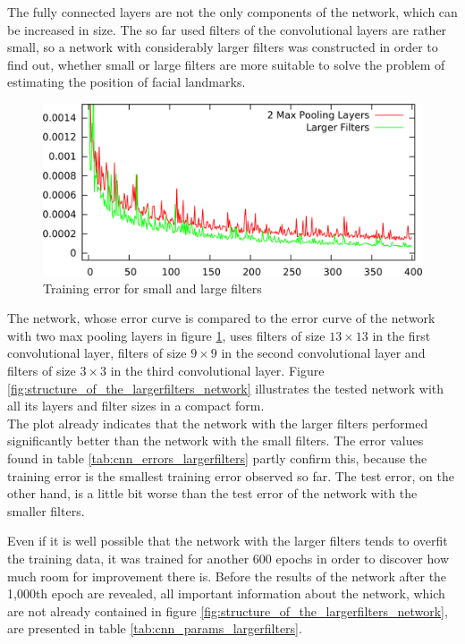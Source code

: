 \documentclass[11pt, a4paper]{article}
\begin{document}
The fully connected layers are not the only components of the network, which can be increased in size. The so far used filters of the convolutional layers are rather small, so a network with considerably larger filters was constructed in order to find out, whether small or large filters are more suitable to solve the problem of estimating the position of facial landmarks.
\begin{figure}[h!]
	\centering
	\includegraphics[width=\textwidth]{results/cnn_largerfilters.png}
	\caption{Training error for small and large filters}
	\label{fig:cnn_largerfilters}
\end{figure}
The network, whose error curve is compared to the error curve of the network with two max pooling layers in figure \ref{fig:cnn_largerfilters}, uses filters of size $13\times13$ in the first convolutional layer, filters of size $9\times9$ in the second convolutional layer and filters of size $3\times3$ in the third convolutional layer. Figure \ref{fig:structure_of_the_largerfilters_network} illustrates the tested network with all its layers and filter sizes in a compact form.
\\
The plot already indicates that the network with the larger filters performed significantly better than the network with the small filters. The error values found in table \ref{tab:cnn_errors_largerfilters} partly confirm this, because the training error is the smallest training error observed so far. The test error, on the other hand, is a little bit worse than the test error of the network with the smaller filters. 

Even if it is well possible that the network with the larger filters tends to overfit the training data, it was trained for another 600 epochs in order to discover how much room for improvement there is. Before the results of the network after the 1,000th epoch are revealed, all important information about the network, which are not already contained in figure \ref{fig:structure_of_the_largerfilters_network}, are presented in table \ref{tab:cnn_params_largerfilters}.
\end{document}
